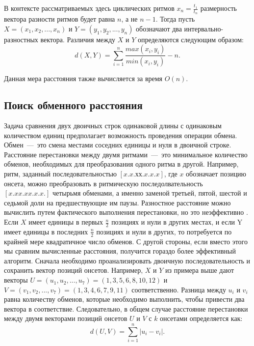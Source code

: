 В контексте рассматриваемых здесь циклических ритмов $x_n = \frac{t_1}{t_n}$ размерность вектора разности ритмов будет равна $n$, а не $n-1$. Тогда пусть $X = (x_1,x_2,...,x_n)$ и $Y = (y_1,y_2,...,y_n)$ обозначают два интервально-разностных вектора. Различия между $X$ и $Y$ определяются следующим образом:
\begin{equation}
	d(X,Y) = \sum_{i = 1}^{n} \frac{max(x_i, y_i)}{min(x_i, y_i)} - n.
\end{equation}

Данная мера расстояния также вычисляется за время $O(n)$.

\subsection{Поиск обменного расстояния}

Задача сравнения двух двоичных строк одинаковой длины с одинаковым количеством единиц предполагает возможность проведения операции обмена. Обмен~---~это смена местами соседних единицы и нуля в двоичной строке. Расстояние перестановки между двумя ритмами~---~это минимальное количество обменов, необходимых для преобразования одного ритма в другой. Например, ритм, заданный последовательностью $[x . x . х х . x . x . x]$, где $x$ обозначает позицию онсета, можно преобразовать в ритмическую последолвательность $[x . x x . x x . x . x .]$ четырьмя обменами, а именно заменой третьей, пятой, шестой и седьмой доли на предшествующие им паузы. 
Разностное расстояние можно вычислить путем фактического выполнения перестановки, но это неэффективно \cite{bib12}. Если $X$ имеет единицы в первых $\frac{n}{2}$ позициях и нули в других местах, и если Y имеет единицы в последних $\frac{n}{2}$ позициях и нули в других, то потребуется по крайней мере квадратичное число обменов. С другой стороны, если вместо этого мы сравним вычисленные расстояния, получится гораздо более эффективный алгоритм. Сначала необходимо проанализировать двоичную последовательность и сохранить вектор позиций онсетов. Например, $X$ и $Y$ из примера выше дают векторы $U = (u_1,u_2,...,u_7) = (1,3,5,6,8,10,12)$ и $V = (v_1,v_2,... ,v_7) = (1,3,4,6,7,9,11)$ соответственно. Разница между $u_i$ и $v_i$ равна количеству обменов, которые необходимо выполнить, чтобы привести два вектора в соответствие. Следовательно, в общем случае расстояние перестановки между двумя векторами позиций онсетов $U$ и $V$ с $k$ онсетами определяется как:
\begin{equation}
	d(U,V) = \sum_{i = 1}^{n} \lvert u_i - v_i \rvert.
\end{equation}


